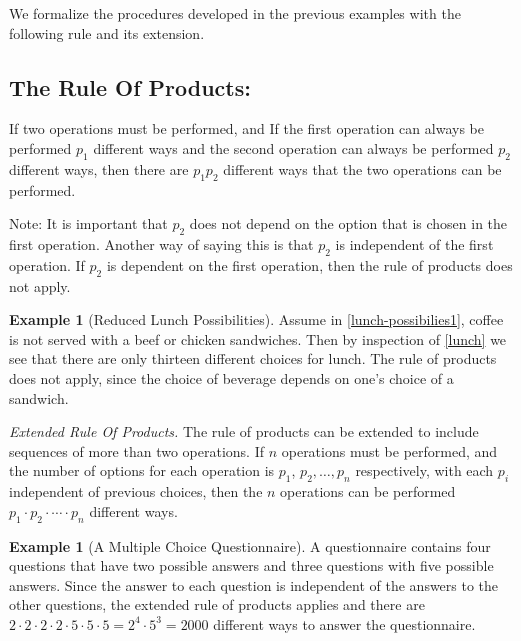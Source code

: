 \documentclass[10pt,]{book}
\theoremstyle{plain}
\theoremstyle{definition}
\theoremstyle{definition}
\newtheorem{example}[theorem]{Example}
\theoremstyle{definition}
\begin{document}
 We formalize the procedures developed in the previous examples with the following rule and its extension.
%
\typeout{************************************************}
\typeout{************************************************}
\subsection[The Rule Of Products:]{The Rule Of Products:}\label{rule-of-products}
If two operations must be performed, and If the first operation can always be performed \(p_1\) different ways and the second operation can always be performed \(p_2\) different ways, then there are \(p_1 p_2\) different ways that the two operations can be performed.
%
\par

Note: It is important that \(p_2\) does not depend on the option that is chosen in the first operation. Another way of saying this is that \(p_2\) is independent of the first operation. If \(p_2\) is dependent on the first operation, then the rule of products does not apply.
%
\begin{example}[Reduced Lunch Possibilities]\label{lunch-possibilites2}
Assume in \hyperref[lunch-possibilies1]{\ref{lunch-possibilies1}}, coffee is not served with a beef or chicken sandwiches. Then by inspection of \hyperref[lunch]{\ref{lunch}} we see that there are only thirteen different choices for lunch. The rule of products does not apply, since the choice of beverage depends on one's choice of a sandwich.%
\end{example}
\par
\emph{Extended Rule Of Products.} The rule of products can be extended to include sequences of more than two operations. If \(n\) operations must be performed, and the number of options for each operation is \(p_1\), \(p_2, \dots, p_n\) respectively, with each \(p_i\)  independent of previous choices, then the \(n\) operations can be performed \(p_1 \cdot p_2 \cdot \cdots \cdot p_n\) different ways.
%
\begin{example}[A Multiple Choice Questionnaire]\label{another_questionnaire}
A questionnaire contains four questions that have two possible answers and three questions with five possible answers. Since the answer to each question is independent of the answers to the other questions, the extended rule of products applies and there are
\(2 \cdot 2 \cdot 2 \cdot 2 \cdot 5 \cdot 5 \cdot 5 = 2^4 \cdot 5^3 = 2000 \) different ways to answer the questionnaire.%
\end{example}
\par
\end{document}

